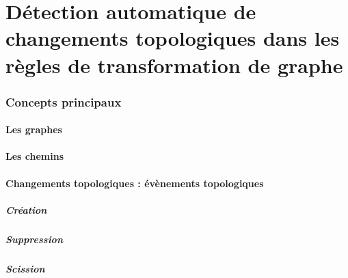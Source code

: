 \part[Détection de changements topologiques]{Détection automatique de changements topologiques dans les règles de transformation de graphe}



\section[Concepts principaux : changements de la topologie]{Concepts principaux}
\label{sec:concepts-principaux}



\subsection[Les graphes]{Les graphes}
\label{sec:les-graphes}



\subsection[Les chemins]{Les chemins}
\label{sec:les-chemins}



\subsection[Changements topologiques, évènements topologiques]{Changements
  topologiques : évènements topologiques}
\label{sec:changements-topo}



\subsubsection[Création]{Création}
\label{sec:graphe-creation}



\subsubsection[Suppression]{Suppression}
\label{sec:graphe-suppression}



\subsubsection[Scission]{Scission}
\label{sec:graphe-scission}



